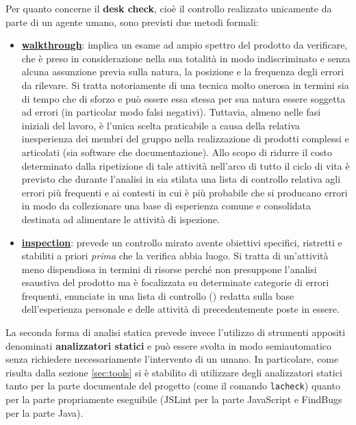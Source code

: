 {Per quanto concerne il \textbf{desk check}, cioè il controllo realizzato unicamente da parte di un agente umano, sono previsti due metodi formali:
\begin{itemize}
  \item \textbf{\underline{walkthrough}}: implica un esame ad ampio spettro del prodotto da verificare, che è preso in considerazione nella sua totalità in modo indiscriminato e senza alcuna assunzione previa sulla natura, la posizione e la frequenza degli errori da rilevare. Si tratta notoriamente di una tecnica molto onerosa in termini sia di tempo che di sforzo e può essere essa stessa per sua natura essere soggetta ad errori (in particolar modo falsi negativi). Tuttavia, almeno nelle fasi iniziali del lavoro, è l'unica scelta praticabile a causa della relativa inesperienza dei membri del gruppo nella realizzazione di prodotti complessi e articolati (sia software che documentazione). Allo scopo di ridurre il costo determinato dalla ripetizione di tale attività nell'arco di tutto il ciclo di vita è previsto che durante l'analisi in sia stilata una lista di controllo relativa agli errori più frequenti e ai contesti in cui è più probabile che si producano errori in modo da collezionare una base di esperienza comune e consolidata destinata ad alimentare le attività di ispezione.
  \item \textbf{\underline{inspection}}: prevede un controllo mirato avente obiettivi specifici, ristretti e stabiliti a priori \emph{prima} che la verifica abbia luogo. Si tratta di un'attività meno dispendiosa in termini di risorse perché non presuppone l'analisi esaustiva del prodotto ma è focalizzata su determinate categorie di errori frequenti, enunciate in una lista di controllo () redatta sulla base dell'esperienza personale e delle attività di  precedentemente poste in essere.
\end{itemize}

La seconda forma di analisi statica prevede invece l'utilizzo di strumenti appositi denominati \textbf{analizzatori statici} e può essere svolta in modo semiautomatico senza richiedere necessariamente l'intervento di un umano. In particolare, come risulta dalla sezione \ref{sec:tools} si è stabilito di utilizzare degli analizzatori statici tanto per la parte documentale del progetto (come il comando \texttt{lacheck}) quanto per la parte propriamente eseguibile (JSLint per la parte JavaScript e FindBugs per la parte Java).

}
